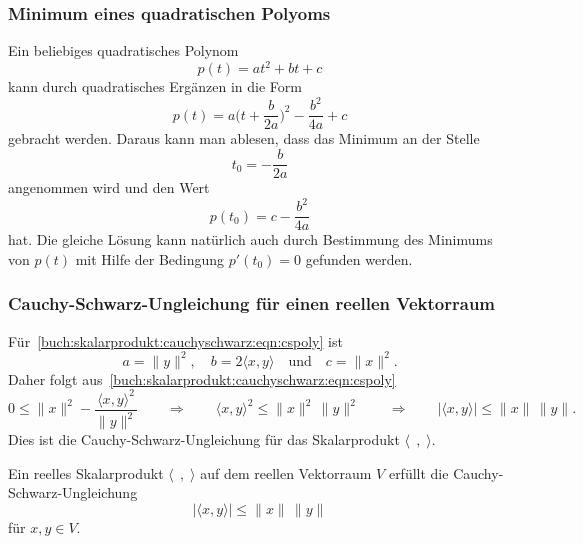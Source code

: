%
%
\subsubsection{Minimum eines quadratischen Polyoms}
Ein beliebiges quadratisches Polynom
\[
p(t)=at^2+bt+c
\]
kann durch
quadratisches Ergänzen in die Form
\[
p(t)
=
a\biggl(t+\frac{b}{2a}\biggr)^2 -\frac{b^2}{4a}+c
\]
gebracht werden.
Daraus kann man ablesen, dass das Minimum an der Stelle
\[
t_0
=
-\frac{b}{2a}
\]
angenommen wird und den Wert 
\begin{equation}
p(t_0)
=
c-\frac{b^2}{4a}
\end{equation}
hat.
Die gleiche Lösung kann natürlich auch durch Bestimmung des Minimums
von $p(t)$ mit Hilfe der Bedingung $p'(t_0)=0$ gefunden werden.

%
%
\subsubsection{Cauchy-Schwarz-Ungleichung für einen reellen Vektorraum}
Für~\eqref{buch:skalarprodukt:cauchyschwarz:eqn:cspoly}
ist
\[
a=\|y\|^2,\quad
b=2\langle x,y\rangle
\quad\text{und}\quad
c=\|x\|^2.
\]
Daher folgt aus~\eqref{buch:skalarprodukt:cauchyschwarz:eqn:cspoly}
\[
0
\le
\|x\|^2 - \frac{\langle x,y\rangle^2}{\|y\|^2}
\qquad\Rightarrow\qquad
\langle x,y\rangle^2 \le \|x\|^2\, \|y\|^2
\qquad\Rightarrow\qquad
|\langle x,y\rangle| \le \|x\|\, \|y\|.
\]
Dies ist die Cauchy-Schwarz-Ungleichung für das Skalarprodukt
$\langle \;\,,\;\rangle$.

\begin{satz}
\label{buch:skalarprodukt:cauchy-schwarz:satz:reell}
Ein reelles Skalarprodukt $\langle\;\,,\;\rangle$ auf dem reellen Vektorraum
$V$ erfüllt die Cauchy-Schwarz-Ungleichung
\[
|\langle x, y\rangle| \le \|x\|\,\|y\|
\]
für $x,y\in V$.
\end{satz}

%
%
